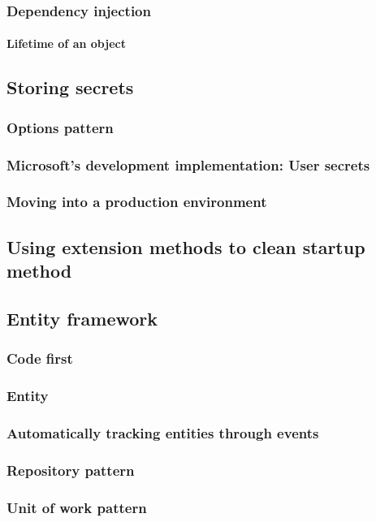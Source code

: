         \subsubsection{Dependency injection}
            \paragraph{Lifetime of an object}
    \subsection{Storing secrets}
        \subsubsection{Options pattern}
        \subsubsection{Microsoft's development implementation: User secrets}
        \subsubsection{Moving into a production environment}
    \subsection{Using extension methods to clean startup method}
    \subsection{Entity framework}
        \subsubsection{Code first}
        \subsubsection{Entity}
        \subsubsection{Automatically tracking entities through events}
        \subsubsection{Repository pattern}
        \subsubsection{Unit of work pattern}
